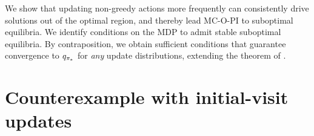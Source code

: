 

We show that updating non-greedy actions more frequently can
consistently drive solutions out of the optimal region,
and thereby lead MC-O-PI to suboptimal equilibria.
We identify conditions on the MDP to admit stable suboptimal equilibria.
By contraposition, we obtain sufficient conditions that guarantee convergence to $q_{{\pi}_*}$ for \textit{any} update distributions, extending the theorem of \citet{Wang2022OnLearning}.




\vspace{-0.3cm}









\section{Counterexample with initial-visit updates}
\label{sec: countered non-greedy bias}

